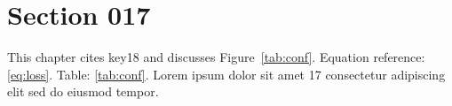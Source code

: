 \section{Section 017}\label{sec:s17}
This chapter cites key18 and discusses Figure~\ref{tab:conf}.
Equation reference: \eqref{eq:loss}. Table: \ref{tab:conf}.
Lorem ipsum dolor sit amet 17 consectetur adipiscing elit sed do eiusmod tempor.
